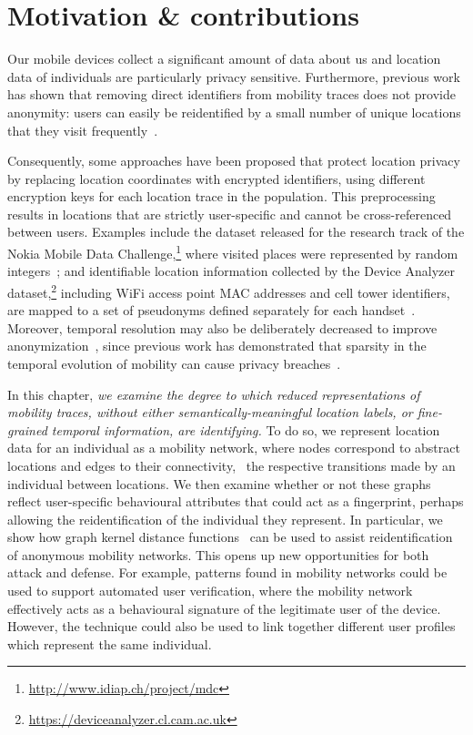 \section{Motivation \& contributions}

Our mobile devices collect a significant amount of data about us and location data of individuals are particularly privacy sensitive.
Furthermore, previous work has shown that removing direct identifiers from mobility traces does not provide anonymity: users can easily be reidentified by a small number of unique locations that they visit frequently~\citep{DeMontjoye2013, Zang2011}.

Consequently, some approaches have been proposed that protect location privacy by replacing location coordinates with encrypted identifiers, using different encryption keys for each location trace in the population.
This preprocessing results in locations that are strictly user-specific and cannot be cross-referenced between users.
Examples include the dataset released for the research track of the Nokia Mobile Data Challenge,\footnote{\url{http://www.idiap.ch/project/mdc}} where visited places were represented by random integers~\citep{Laurila}; and identifiable location information collected by the Device Analyzer dataset,\footnote{\url{https://deviceanalyzer.cl.cam.ac.uk}} including WiFi access point MAC addresses and cell tower identifiers, are mapped to a set of pseudonyms defined separately for each handset~\citep{Wagner2014}.
Moreover, temporal resolution may also be deliberately decreased to improve anonymization~\citep{Gruteser}, since previous work has demonstrated that sparsity in the temporal evolution of mobility can cause privacy breaches~\citep{DeMontjoye2013}.

In this chapter, \emph{we examine the degree to which reduced representations of mobility traces, without either semantically-meaningful location labels, or fine-grained temporal information, are identifying.}
To do so, we represent location data for an individual as a mobility network, where nodes correspond to abstract locations and edges to their connectivity, \ie\ the respective transitions made by an individual between locations.
We then examine whether or not these graphs reflect user-specific behavioural attributes that could act as a fingerprint, perhaps allowing the reidentification of the individual they represent.
In particular, we show how graph kernel distance functions~\citep{Vishwanathan2010} can be used to assist reidentification of anonymous mobility networks.
This opens up new opportunities for both attack and defense.
For example, patterns found in mobility networks could be used to support automated user verification, where the mobility network effectively acts as a behavioural signature of the legitimate user of the device.
However, the technique could also be used to link together different user profiles which represent the same individual.


